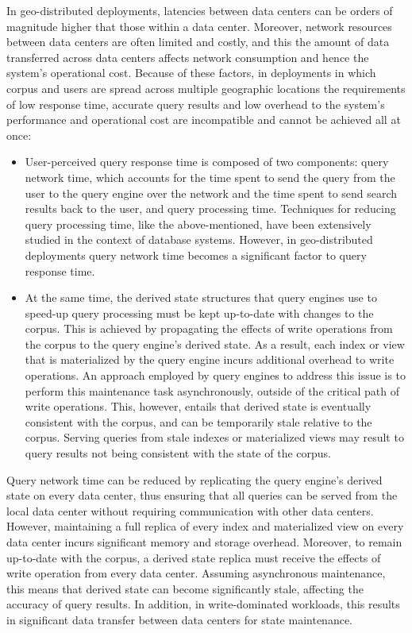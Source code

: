 In geo-distributed deployments,
latencies between data centers can be orders of magnitude higher that those within a data center.
Moreover, network resources between data centers are often limited and costly,
and this the amount of data transferred across data centers affects network consumption and hence the system’s operational cost.
Because of these factors,
in deployments in which corpus and users are spread across multiple geographic locations
the requirements of low response time, accurate query results and low overhead to the system's performance and operational
cost are incompatible and cannot be achieved all at once:

\begin{itemize}
  \item User-perceived query response time is composed of two components:
  query network time, which accounts for the time spent to send the query from the user to the query engine over the network
  and the time spent to send search results back to the user, and query processing time.
  Techniques for reducing query processing time, like the above-mentioned, have been extensively studied in the context of database systems.
  However, in geo-distributed deployments query network time becomes a significant factor to query response time.

  \item At the same time, the derived state structures that query engines use to speed-up query processing must be kept up-to-date with changes to the corpus.
  This is achieved by propagating the effects of write operations from the corpus to the query engine's derived state.
  As a result, each index or view that is materialized by the query engine incurs additional overhead to write operations.
  An approach employed by query engines to address this issue is to perform this maintenance task asynchronously,
  outside of the critical path of write operations.
  This, however, entails that derived state is eventually consistent with the corpus, and can be temporarily stale relative to the corpus.
  Serving queries from stale indexes or materialized views may result to query results not being consistent with the state of the corpus.
\end{itemize}

Query network time can be reduced by replicating the query engine's derived state on every data center,
thus ensuring that all queries can be served from the local data center without requiring communication with other data centers.
However, maintaining a full replica of every index and materialized view on every data center incurs significant memory and storage overhead.
Moreover, to remain up-to-date with the corpus, a derived state replica must receive the effects of write operation from every data center.
Assuming asynchronous maintenance, this means that derived state can become significantly stale, affecting the accuracy of query results.
In addition, in write-dominated workloads, this results in significant data transfer between data centers for state maintenance.

